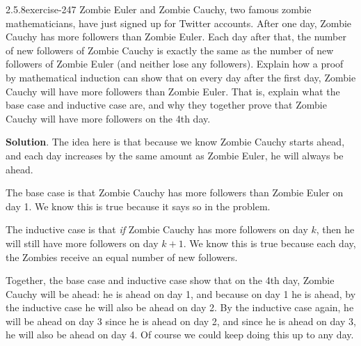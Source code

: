 \documentclass[twoside,11pt,]{book}
\numberwithin{equation}{chapter}
\begin{document}
\begin{divisionsolution}{2.5.8}{}{exercise-247}%
\hypertarget{p-3609}{}%
Zombie Euler and Zombie Cauchy, two famous zombie mathematicians, have just signed up for Twitter accounts. After one day, Zombie Cauchy has more followers than Zombie Euler. Each day after that, the number of new followers of Zombie Cauchy is exactly the same as the number of new followers of Zombie Euler (and neither lose any followers). Explain how a proof by mathematical induction can show that on every day after the first day, Zombie Cauchy will have more followers than Zombie Euler. That is, explain what the base case and inductive case are, and why they together prove that Zombie Cauchy will have more followers on the 4th day.%
\par\smallskip%
\noindent\textbf{Solution}.\quad%
\hypertarget{p-3610}{}%
The idea here is that because we know Zombie Cauchy starts ahead, and each day increases by the same amount as Zombie Euler, he will always be ahead.%
\par
\hypertarget{p-3611}{}%
The base case is that Zombie Cauchy has more followers than Zombie Euler on day 1. We know this is true because it says so in the problem.%
\par
\hypertarget{p-3612}{}%
The inductive case is that \emph{if} Zombie Cauchy has more followers on day \(k\), then he will still have more followers on day \(k+1\). We know this is true because each day, the Zombies receive an equal number of new followers.%
\par
\hypertarget{p-3613}{}%
Together, the base case and inductive case show that on the 4th day, Zombie Cauchy will be ahead: he is ahead on day 1, and because on day 1 he is ahead, by the inductive case he will also be ahead on day 2. By the inductive case again, he will be ahead on day 3 since he is ahead on day 2, and since he is ahead on day 3, he will also be ahead on day 4. Of course we could keep doing this up to any day.%
\end{divisionsolution}%
\end{document}

